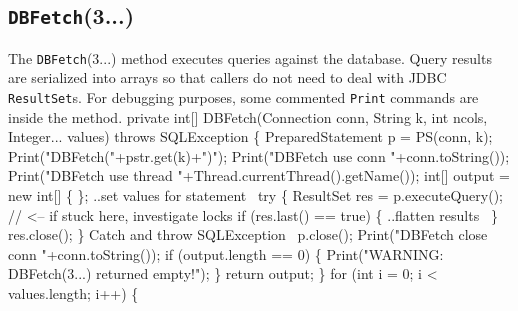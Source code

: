 \documentclass{article}
\def\nwendcode{\endtrivlist \endgroup}      %
\theoremstyle{definition}                   %
\begin{document}
\subsection{{\tt{}\protect{}DBFetch}(3...)}
The {\tt{}\protect{}DBFetch}(3...) method executes queries against the database. Query
results are serialized into arrays so that callers do not need to deal with
JDBC {\tt{}ResultSet}s. For debugging purposes, some commented {\tt{}\protect{}Print} commands
are inside the method.
\nwenddocs{}\endmoddef{}
private int[] DBFetch(Connection conn,
    String k, int ncols, Integer... values) throws SQLException \{
  PreparedStatement p = PS(conn, k);
  Print("DBFetch("+pstr.get(k)+")");
  Print("DBFetch use conn "+conn.toString());
  Print("DBFetch use thread "+Thread.currentThread().getName());
  int[] output = new int[] \{ \};
  \LA{}..set values for statement~{\nwtagstyle{}}\RA{}
  try \{
    ResultSet res = p.executeQuery();  // <-- if stuck here, investigate locks
    if (res.last() == true) \{
      \LA{}..flatten results~{\nwtagstyle{}}\RA{}
    \}
    res.close();
  \}
  \LA{}Catch and throw \code{}SQLException\edoc{}~{\nwtagstyle{}}\RA{}
  p.close();
  Print("DBFetch close conn "+conn.toString());
  if (output.length == 0) \{
    Print("WARNING: DBFetch(3...) returned empty!");
  \}
  return output;
\}
\eatline
{}\nwendcode{}\endmoddef{}
for (int i = 0; i < values.length; i++) \{
\end{document}
